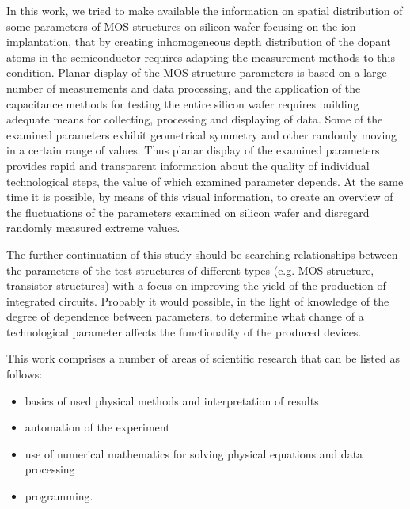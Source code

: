 \par In this work, we tried to make available the information on
spatial distribution of some parameters of MOS structures on silicon
wafer focusing on the ion implantation, that by creating inhomogeneous
depth distribution of the dopant atoms in the semiconductor requires
adapting the measurement methods to this condition. Planar display of
the MOS structure parameters is based on a large number of
measurements and data processing, and the application of the
capacitance methods for testing the entire silicon wafer requires
building adequate means for collecting, processing and displaying of
data. Some of the examined parameters exhibit geometrical symmetry and
other randomly moving in a certain range of values. Thus planar
display of the examined parameters provides rapid and transparent
information about the quality of individual technological steps, the
value of which examined parameter depends. At the same time it is
possible, by means of this visual information, to create an overview
of the fluctuations of the parameters examined on silicon wafer and
disregard randomly measured extreme values.

\par The further continuation of this study should be searching
relationships between the parameters of the test structures of
different types (e.g. MOS structure, transistor structures) with a
focus on improving the yield of the production of integrated
circuits. Probably it would possible, in the light of knowledge of the
degree of dependence between parameters, to determine what change of a
technological parameter affects the functionality of the produced
devices.

\par This work comprises a number of areas of scientific research that
can be listed as follows:
\begin{itemize}
\item{basics of used physical methods and interpretation of results}
\item{automation of the experiment}
\item{use of numerical mathematics for solving physical equations and
  data processing}
\item{programming}.
\end{itemize}

